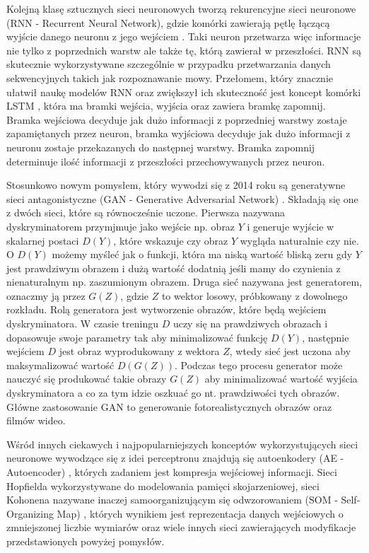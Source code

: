 \documentclass[11pt]{book}
\theoremstyle{definition}
\begin{document}
Kolejną klasę sztucznych sieci neuronowych tworzą rekurencyjne sieci neuronowe (RNN - Recurrent Neural Network), gdzie komórki zawierają pętlę łączącą wyjście danego neuronu z jego wejściem \cite{1990RNN}. Taki neuron przetwarza więc informacje nie tylko z poprzednich warstw ale także tę, którą zawierał w przeszłości. RNN są skutecznie wykorzystywane szczególnie w przypadku przetwarzania danych sekwencyjnych takich jak rozpoznawanie mowy. Przełomem, który znacznie ułatwił naukę modelów RNN oraz zwiększył ich skuteczność jest koncept komórki LSTM \cite{hochreiter1997long}, która ma bramki wejścia, wyjścia oraz zawiera bramkę zapomnij. Bramka wejściowa decyduje jak dużo informacji z poprzedniej warstwy zostaje zapamiętanych przez neuron, bramka wyjściowa decyduje jak dużo informacji z neuronu zostaje przekazanych do następnej warstwy. Bramka zapomnij determinuje ilość informacji z przeszłości przechowywanych przez neuron.

Stosunkowo nowym pomysłem, który wywodzi się z 2014 roku są generatywne sieci antagonistyczne (GAN - Generative Adversarial Network) \cite{2014arXiv1406.2661G}. Składają się one z dwóch sieci, które są równocześnie uczone. Pierwsza nazywana dyskryminatorem przymjmuje jako wejście np. obraz $Y$ i generuje wyjście w skalarnej postaci $D(Y)$, które wskazuje czy obraz $Y$ wygląda naturalnie czy nie. O $D(Y)$ możemy myśleć jak o funkcji, która ma niską wartość bliską zeru gdy $Y$ jest prawdziwym obrazem i dużą wartość dodatnią jeśli mamy do czynienia z nienaturalnym np. zaszumionym obrazem. Druga sieć nazywana jest generatorem, oznaczmy ją przez $G(Z)$, gdzie $Z$ to wektor losowy, próbkowany z dowolnego rozkładu. Rolą generatora jest wytworzenie obrazów, które będą wejściem dyskryminatora. W czasie treningu $D$ uczy się na prawdziwych obrazach i dopasowuje swoje parametry tak aby minimalizować funkcję $D(Y)$, następnie wejściem $D$ jest obraz wyprodukowany z wektora $Z$, wtedy sieć jest uczona aby maksymalizować wartość $D(G(Z))$. Podczas tego procesu generator może nauczyć się produkować takie obrazy $G(Z)$ aby minimalizować wartość wyjścia dyskryminatora a co za tym idzie oszkuać go nt. prawdziwości tych obrazów. Główne zastosowanie GAN to generowanie fotorealistycznych obrazów oraz filmów wideo.

Wśród innych ciekawych i najpopularniejszych konceptów wykorzystujących sieci neuronowe wywodzące się z idei perceptronu znajdują się autoenkodery (AE - Autoencoder) \cite{1988Autoencoders}, których zadaniem jest kompresja wejściowej informacji. Sieci Hopfielda \cite{hopfield-neural-networks-and-1982} wykorzystywane do modelowania pamięci skojarzeniowej, sieci Kohonena nazywane inaczej samoorganizującym się odwzorowaniem (SOM - Self-Organizing Map) \cite{Kohonen1982}, których wynikiem jest reprezentacja danych wejściowych o zmniejszonej liczbie wymiarów oraz wiele innych sieci zawierających modyfikacje przedstawionych powyżej pomysłów.
\end{document}
